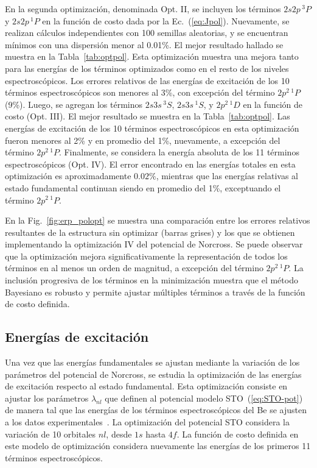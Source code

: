 En la segunda optimización, denominada Opt. II, se incluyen los términos 
$2s2p\,^3P$ y $2s2p\,^1P$ en la función de costo dada por la 
Ec.~(\ref{eq:Jpol}). Nuevamente, se realizan cálculos independientes con 
100 semillas aleatorias, y se encuentran mínimos con una dispersión 
menor al 0.01\%. El mejor resultado hallado se muestra en la 
Tabla~\ref{tab:optpol}. Esta optimización muestra una mejora tanto para 
las energías de los términos optimizados como en el resto de 
los niveles espectroscópicos. Los errores relativos de las energías de 
excitación de los 10 términos espectroscópicos son menores al 3\%, con 
excepción del término $2p^2\,^1P$ (9\%). 
Luego, se agregan los términos $2s3s\,^3S$, $2s3s\,^1S$, y $2p^2\,^1D$ 
en la función de costo (Opt. III). El mejor resultado se muestra en 
la Tabla~\ref{tab:optpol}. Las energías de excitación de los 10 términos 
espectroscópicos en esta optimización fueron menores al 2\% y en 
promedio del 1\%, nuevamente, a excepción del término $2p^2\,^1P$. 
Finalmente, se considera la energía absoluta de los 11 términos 
espectroscópicos (Opt. IV). El error encontrado en las energías totales
en esta optimización es aproximadamente $0.02\%$, mientras que las 
energías relativas al estado fundamental continuan siendo en promedio 
del 1\%, exceptuando el término $2p^2\,^1P$. 

En la Fig.~\ref{fig:erp_polopt} se muestra una comparación entre los 
errores relativos resultantes de la estructura sin optimizar (barras 
grises) y los que se obtienen implementando la optimización IV del 
potencial de Norcross. Se puede observar que la optimización mejora 
significativamente la representación de todos los términos en al menos
un orden de magnitud, a excepción del término $2p^2\,^1P$. La inclusión
progresiva de los términos en la minimización muestra que el método 
Bayesiano es robusto y permite ajustar múltiples términos a través de 
la función de costo definida.

\subsection{Energías de excitación}

Una vez que las energías fundamentales se ajustan mediante la variación 
de los parámetros del potencial de Norcross, se estudia la optimización 
de las energías de excitación respecto al estado fundamental. Esta 
optimización consiste en ajustar los parámetros $\lambda_{nl}$ que 
definen al potencial modelo STO~(\ref{eq:STO-pot}) de manera tal que las 
energías de los términos espectroscópicos del Be se ajusten a los datos 
experimentales~\cite{NIST}. 
La optimización del potencial STO considera la variación de 10 orbitales 
$nl$, desde $1s$ hasta $4f$. La función de costo definida en este modelo 
de optimización considera nuevamente las energías de los primeros 11 
términos espectroscópicos. 

